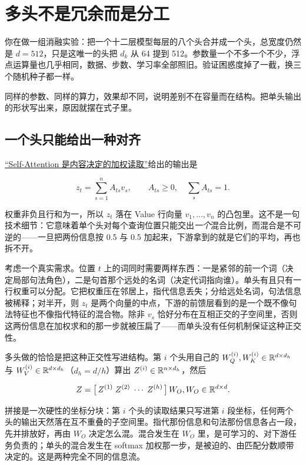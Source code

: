 \section{多头不是冗余而是分工}
\label{sec:14-Deep-Learning/05-Attention-and-Sequence-Models/02}

你在做一组消融实验：把一个十二层模型每层的八个头合并成一个头，总宽度仍然是 \(d=512\)，只是这唯一的头把 \(d_k\) 从 64 提到 512。参数量一个不多一个不少，浮点运算量也几乎相同，数据、步数、学习率全部照旧。验证困惑度掉了一截，换三个随机种子都一样。

同样的参数、同样的算力，效果却不同，说明差别不在容量而在结构。把单头输出的形状写出来，原因就摆在式子里。

\subsection{一个头只能给出一种对齐}

\hyperref[sec:14-Deep-Learning/05-Attention-and-Sequence-Models/01]{``Self-Attention 是内容决定的加权读取''}给出的输出是

\[
z_t = \sum_{s=1}^{n} A_{ts} v_s,\qquad A_{ts}\ge 0,\quad \sum_s A_{ts}=1.
\]

权重非负且行和为一，所以 \(z_t\) 落在 Value 行向量 \(v_1,\ldots,v_n\) 的凸包里。这不是一句技术细节：它意味着单个头对每个查询位置只能交出\emph{一个}混合比例，而混合是不可逆的——一旦把两份信息按 0.5 与 0.5 加起来，下游拿到的就是它们的平均，再也拆不开。

考虑一个真实需求。位置 \(t\) 上的词同时需要两样东西：一是紧邻的前一个词（决定局部句法角色），二是句首那个远处的名词（决定代词指向谁）。单头有且只有一行权重可以分配。它把权重压在邻居上，指代信息丢失；分给远处名词，句法信息被稀释；对半开，则 \(z_t\) 是两个向量的中点，下游的前馈层看到的是一个既不像句法特征也不像指代特征的混合物。除非 \(v_s\) 恰好分布在互相正交的子空间里，否则这两份信息在加权求和的那一步就被压扁了——而单头没有任何机制保证这种正交性。

多头做的恰恰是把这种正交性写进结构。第 \(i\) 个头用自己的 \(W_Q^{(i)},W_K^{(i)}\in\mathbb{R}^{d\times d_h}\) 与 \(W_V^{(i)}\in\mathbb{R}^{d\times d_h}\)（\(d_h=d/h\)）算出 \(Z^{(i)}\in\mathbb{R}^{n\times d_h}\)，然后

\[
Z = \bigl[\,Z^{(1)}\;Z^{(2)}\;\cdots\;Z^{(h)}\,\bigr]\,W_O,
\space W_O\in\mathbb{R}^{d\times d}.
\]

拼接是一次硬性的坐标分块：第 \(i\) 个头的读取结果只写进第 \(i\) 段坐标，任何两个头的输出天然落在互不重叠的子空间里。指代那份信息和句法那份信息各占一段，先并排放好，再由 \(W_O\) 决定怎么混。混合发生在 \(W_O\) 里，是可学习的、对下游任务负责的；单头的混合发生在 softmax 加权那一步，是被迫的、由匹配分数顺带决定的。这是两种完全不同的信息流。

